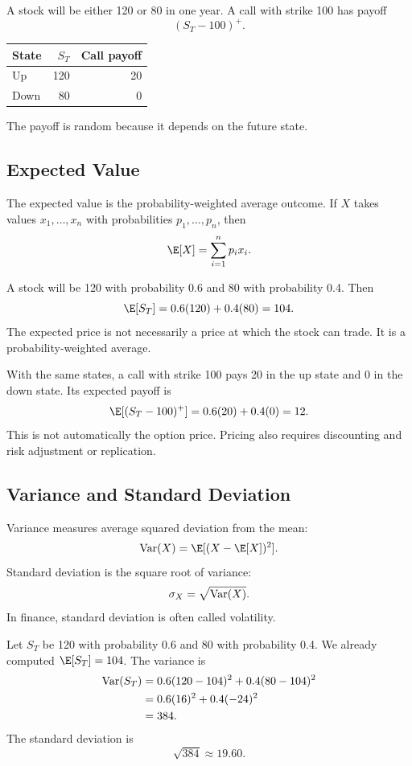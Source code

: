 \begin{exmp}
A stock will be either 120 or 80 in one year. A call with strike 100 has payoff
\[
    (S_T-100)^+.
\]
\begin{tabular}{@{}lrr@{}}
\toprule
State & $S_T$ & Call payoff \\
\midrule
Up & 120 & 20 \\
Down & 80 & 0 \\
\bottomrule
\end{tabular}
The payoff is random because it depends on the future state.
\end{exmp}

\subsection{Expected Value}

The expected value is the probability-weighted average outcome. If $X$ takes
values $x_1,\ldots,x_n$ with probabilities $p_1,\ldots,p_n$, then
\[
    \E[X]=\sum_{i=1}^{n}p_i x_i.
\]

\begin{exmp}
A stock will be 120 with probability 0.6 and 80 with probability 0.4. Then
\[
    \E[S_T]=0.6(120)+0.4(80)=104.
\]
The expected price is not necessarily a price at which the stock can trade. It
is a probability-weighted average.
\end{exmp}

\begin{exmp}
With the same states, a call with strike 100 pays 20 in the up state and 0 in
the down state. Its expected payoff is
\[
    \E[(S_T-100)^+]=0.6(20)+0.4(0)=12.
\]
This is not automatically the option price. Pricing also requires discounting
and risk adjustment or replication.
\end{exmp}

\subsection{Variance and Standard Deviation}

Variance measures average squared deviation from the mean:
\[
    \Var(X)=\E[(X-\E[X])^2].
\]
Standard deviation is the square root of variance:
\[
    \sigma_X=\sqrt{\operatorname{Var}(X)}.
\]
In finance, standard deviation is often called volatility.

\begin{exmp}
Let $S_T$ be 120 with probability 0.6 and 80 with probability 0.4. We already
computed $\E[S_T]=104$. The variance is
\[
\begin{aligned}
    \operatorname{Var}(S_T)
    &=
    0.6(120-104)^2+0.4(80-104)^2\\
    &=
    0.6(16)^2+0.4(-24)^2\\
    &=
    384.
\end{aligned}
\]
The standard deviation is
\[
    \sqrt{384}\approx 19.60.
\]
\end{exmp}

